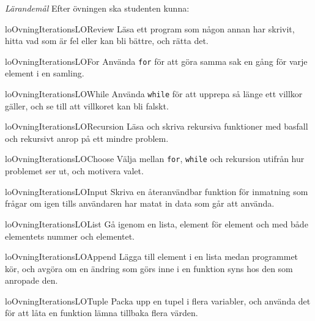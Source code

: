 \emph{Lärandemål}
Efter övningen ska studenten kunna:
\begin{restatable}{lo}{OvningIterationsLOReview}%
  \label{OvningIterationsLOReview}%
  Läsa ett program som någon annan har skrivit, hitta vad som är fel
  eller kan bli bättre, och rätta det. %
\end{restatable}
\begin{restatable}{lo}{OvningIterationsLOFor}\label{OvningIterationsLOFor}%
  Använda \texttt{for} för att göra samma sak en gång för
  varje element i en samling. %
\end{restatable}
\begin{restatable}{lo}{OvningIterationsLOWhile}%
  \label{OvningIterationsLOWhile}%
  Använda \texttt{while} för att upprepa så länge ett villkor
  gäller, och se till att villkoret kan bli falskt. %
\end{restatable}
\begin{restatable}{lo}{OvningIterationsLORecursion}%
  \label{OvningIterationsLORecursion}%
  Läsa och skriva rekursiva funktioner med basfall och rekursivt anrop på
  ett mindre problem. %
\end{restatable}
\begin{restatable}{lo}{OvningIterationsLOChoose}%
  \label{OvningIterationsLOChoose}%
  Välja mellan \texttt{for}, \texttt{while} och
  rekursion utifrån hur problemet ser ut, och motivera valet. %
\end{restatable}
\begin{restatable}{lo}{OvningIterationsLOInput}%
  \label{OvningIterationsLOInput}%
  Skriva en återanvändbar funktion för inmatning som frågar om igen tills
  användaren har matat in data som går att använda. %
\end{restatable}
\begin{restatable}{lo}{OvningIterationsLOList}%
  \label{OvningIterationsLOList}%
  Gå igenom en lista, element för element och med både elementets nummer
  och elementet. %
\end{restatable}
\begin{restatable}{lo}{OvningIterationsLOAppend}%
  \label{OvningIterationsLOAppend}%
  Lägga till element i en lista medan programmet kör, och avgöra om en
  ändring som görs inne i en funktion syns hos den som anropade
  den. %
\end{restatable}
\begin{restatable}{lo}{OvningIterationsLOTuple}%
  \label{OvningIterationsLOTuple}%
  Packa upp en tupel i flera variabler, och använda det för att låta en
  funktion lämna tillbaka flera värden. %
\end{restatable}
